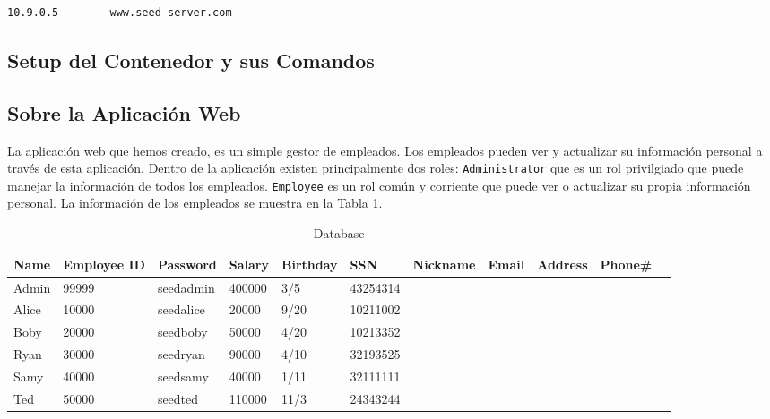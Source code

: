 \begin{lstlisting}
10.9.0.5        www.seed-server.com
\end{lstlisting}
 

\subsection{Setup del Contenedor y sus Comandos}








\subsection{Sobre la Aplicación Web} 

La aplicación web que hemos creado, es un simple gestor de empleados.
Los empleados pueden ver y actualizar su información personal a través de esta aplicación.
Dentro de la aplicación existen principalmente dos roles:
{\tt Administrator} que es un rol privilgiado que puede manejar la información de todos los empleados.
{\tt Employee} es un rol común y corriente que puede ver o actualizar su propia información personal. La información de los empleados se muestra en la Tabla
\ref{table:database}.

\begin{table}[htb]
\caption{Database}
\label{table:database}
\centering
\begin{adjustbox}{max width=\textwidth}
\begin{tabular}{|l|l|l|l|l|l|l|l|l|l|l|}
\hline
Name & Employee ID  & Password  &Salary  &Birthday  &SSN &Nickname &Email &Address &Phone\# \\
\hline
Admin 	& 99999       & seedadmin  &400000  &3/5   &43254314	& & & &\\
Alice 	& 10000       & seedalice  &20000   &9/20  &10211002	& & & &\\
Boby 	& 20000       & seedboby   &50000   &4/20  &10213352	& & & &\\
Ryan    & 30000       & seedryan   &90000   &4/10  &32193525	& & & &\\
Samy 	& 40000	      & seedsamy   &40000   &1/11  &32111111 	& & & &\\
Ted     & 50000	      & seedted    &110000  &11/3  &24343244	& & & &\\
\hline
\end{tabular}
\end{adjustbox}
\end{table}
 




